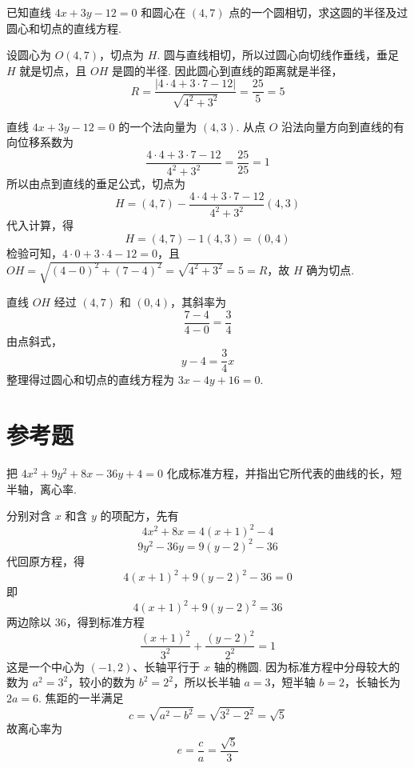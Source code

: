 \begin{problem}
已知直线 \(4x+3y-12=0\) 和圆心在 \(\left(4,7\right)\) 点的一个圆相切，求这圆的半径及过圆心和切点的直线方程.
\end{problem}

\begin{solution}
设圆心为 \(O\left(4,7\right)\)，切点为 \(H\). 圆与直线相切，所以过圆心向切线作垂线，垂足 \(H\) 就是切点，且 \(OH\) 是圆的半径. 因此圆心到直线的距离就是半径，
\[
R=\frac{\left|4\cdot4+3\cdot7-12\right|}{\sqrt{4^2+3^2}}=\frac{25}{5}=5
\]

直线 \(4x+3y-12=0\) 的一个法向量为 \(\left(4,3\right)\). 从点 \(O\) 沿法向量方向到直线的有向位移系数为
\[
\frac{4\cdot4+3\cdot7-12}{4^2+3^2}=\frac{25}{25}=1
\]
所以由点到直线的垂足公式，切点为
\[
H=\left(4,7\right)-\frac{4\cdot4+3\cdot7-12}{4^2+3^2}\left(4,3\right)
\]
代入计算，得
\[
H=\left(4,7\right)-1\left(4,3\right)=\left(0,4\right)
\]
检验可知，\(4\cdot0+3\cdot4-12=0\)，且 \(OH=\sqrt{(4-0)^2+(7-4)^2}=\sqrt{4^2+3^2}=5=R\)，故 \(H\) 确为切点.

直线 \(OH\) 经过 \(\left(4,7\right)\) 和 \(\left(0,4\right)\)，其斜率为
\[
\frac{7-4}{4-0}=\frac34
\]
由点斜式，
\[
y-4=\frac{3}{4}x
\]
整理得过圆心和切点的直线方程为 \(3x-4y+16=0\).
\end{solution}

\section{参考题}

\begin{problem}
把 \(4x^2+9y^2+8x-36y+4=0\) 化成标准方程，并指出它所代表的曲线的长，短半轴，离心率.
\end{problem}

\begin{solution}
分别对含 \(x\) 和含 \(y\) 的项配方，先有
\[
4x^2+8x=4\left(x+1\right)^2-4
\]
\[
9y^2-36y=9\left(y-2\right)^2-36
\]
代回原方程，得
\[
4\left(x+1\right)^2+9\left(y-2\right)^2-36=0
\]
即
\[
4\left(x+1\right)^2+9\left(y-2\right)^2=36
\]
两边除以 \(36\)，得到标准方程
\[
\frac{\left(x+1\right)^2}{3^2}+\frac{\left(y-2\right)^2}{2^2}=1
\]
这是一个中心为 \(\left(-1,2\right)\)、长轴平行于 \(x\) 轴的椭圆. 因为标准方程中分母较大的数为 \(a^2=3^2\)，较小的数为 \(b^2=2^2\)，所以长半轴 \(a=3\)，短半轴 \(b=2\)，长轴长为 \(2a=6\). 焦距的一半满足
\[
c=\sqrt{a^2-b^2}=\sqrt{3^2-2^2}=\sqrt{5}
\]
故离心率为
\[
e=\frac{c}{a}=\frac{\sqrt{5}}{3}
\]
\end{solution}

